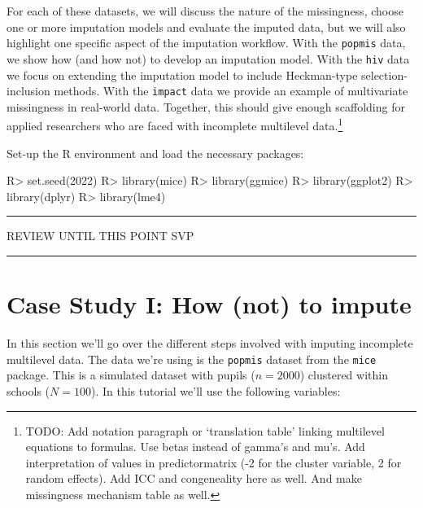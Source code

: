 \documentclass[
]{jss}
\begin{document}
For each of these datasets, we will discuss the nature of the
missingness, choose one or more imputation models and evaluate the
imputed data, but we will also highlight one specific aspect of the
imputation workflow. With the \texttt{popmis} data, we show how (and how
not) to develop an imputation model. With the \texttt{hiv} data we focus
on extending the imputation model to include Heckman-type
selection-inclusion methods. With the \texttt{impact} data we provide an
example of multivariate missingness in real-world data. Together, this
should give enough scaffolding for applied researchers who are faced
with incomplete multilevel data.\footnote{TODO: Add notation paragraph
  or `translation table' linking multilevel equations to 
  formulas. Use betas instead of gamma's and mu's. Add interpretation of
  values in predictormatrix (-2 for the cluster variable, 2 for random
  effects). Add ICC and congeneality here as well. And make missingness
  mechanism table as well.}

Set-up the R environment and load the necessary packages:

\begin{CodeChunk}
\begin{CodeInput}
R> set.seed(2022)
R> library(mice)
R> library(ggmice)
R> library(ggplot2)
R> library(dplyr)
R> library(lme4)
\end{CodeInput}
\end{CodeChunk}

\begin{center}\rule{0.5\linewidth}{0.5pt}\end{center}

\begin{center}
REVIEW UNTIL THIS POINT SVP
\end{center}

\begin{center}\rule{0.5\linewidth}{0.5pt}\end{center}

\hypertarget{case-study-i-how-not-to-impute}{%
\section{Case Study I: How (not) to
impute}\label{case-study-i-how-not-to-impute}}

In this section we'll go over the different steps involved with imputing
incomplete multilevel data. The data we're using is the \texttt{popmis}
dataset from the \texttt{mice} package. This is a simulated dataset with
pupils (\(n = 2000\)) clustered within schools (\(N = 100\)). In this
tutorial we'll use the following variables:
\end{document}
